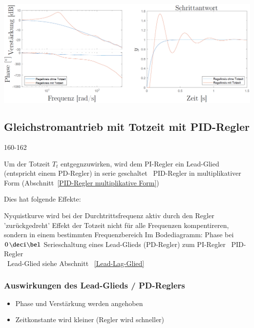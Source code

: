\includegraphics[width=\columnwidth]{images/gleichstromantrieb_pi-regler_totzeit_step_response.png}


\subsection{Gleichstromantrieb mit Totzeit mit PID-Regler}{160-162}

Um der Totzeit $T_t$ entgegnzuwirken, wird dem PI-Regler ein Lead-Glied (entspricht einem PD-Regler) in serie geschaltet 
\textrightarrow\ PID-Regler in multiplikativer Form (Abschnitt~\ref{PID-Regler multiplikative Form})

\medskip
Dies hat folgende Effekte:
\begin{outline}
    \1 Nyquistkurve wird bei der Durchtrittsfrequenz aktiv durch den Regler 'zurückgedreht' 
        \2 Effekt der Totzeit nicht für alle Frequenzen kompentireren, sondern in einem bestimmten Frequenzbereich
        \2 Im Bodediagramm: Phase bei $0 \, \deci \bel$ 
    \1 Serieschaltung eines Lead-Glieds (PD-Regler) zum PI-Regler \textrightarrow\ PID-Regler \\
        \textrightarrow\ Lead-Glied siehe Abschnitt ~\ref{Lead-Lag-Glied}
\end{outline}


\subsubsection{Auswirkungen des Lead-Glieds / PD-Reglers}

\begin{itemize}
    \item Phase und Verstärkung werden angehoben
    \item Zeitkonstante wird kleiner (Regler wird schneller)
\end{itemize}

